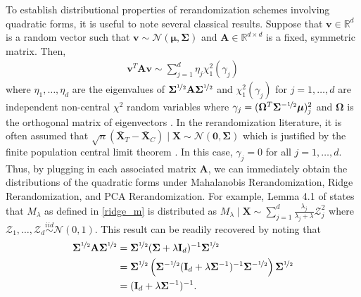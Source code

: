 \documentclass[11pt,twoside]{article}
\theoremstyle{definition}
\theoremstyle{remark}
\begin{document}
To establish distributional properties of rerandomization schemes involving quadratic forms, it is useful to note several classical results. Suppose that $\mathbf{v} \in \mathbb{R}^d$ is a random vector such that $\mathbf{v} \sim \mathcal{N}(\bm{\mu}, \mathbf{\Sigma})$ and $\mathbf{A} \in \mathbb{R}^{d \times d}$ is a fixed, symmetric matrix. Then,
\begin{align} \label{qfr_distribution}
    \mathbf{v}^T \mathbf{A} \mathbf{v} \sim \sum^d_{j=1} \eta_j \chi^2_1(\gamma_j)
\end{align}
where $\eta_1, \ldots, \eta_d$ are the eigenvalues of $\mathbf{\Sigma}^{\nicefrac{1}{2}} \mathbf{A} \mathbf{\Sigma}^{\nicefrac{1}{2}}$ and $\chi^2_1(\gamma_j)$ for $j = 1, \ldots, d$ are independent non-central $\chi^2$ random variables where $\gamma_j = (\mathbf{\Omega}^T \mathbf{\Sigma}^{-\nicefrac{1}{2}} \bm{\mu})^2_j$ and $\mathbf{\Omega}$ is the orthogonal matrix of eigenvectors \citep{mathai1992quadratic}. In the rerandomization literature, it is often assumed that $\sqrt{n}(\bar{\mathbf{X}}_T - \bar{\mathbf{X}}_C) \mid \mathbf{X} \sim \mathcal{N}(\mathbf{0}, \mathbf{\Sigma})$ which is justified by the finite population central limit theorem \citep{li2017general}. In this case, $\gamma_j = 0$ for all $j = 1, \dots, d$. Thus, by plugging in each associated matrix $\mathbf{A}$, we can immediately obtain the distributions of the quadratic forms under Mahalanobis Rerandomization, Ridge Rerandomization, and PCA Rerandomization. For example, Lemma 4.1 of \cite{branson2021ridge} states that $M_{\lambda}$ as defined in \cref{ridge_m} is distributed as $ M_{\lambda} \mid \mathbf{X} \sim \sum_{j=1}^d \frac{\lambda_j}{\lambda_j + \lambda} \mathcal{Z}^2_j$ where $\mathcal{Z}_1, \ldots, \mathcal{Z}_d \overset{iid}{\sim} \mathcal{N}(0, 1)$. This result can be readily recovered by noting that
\begin{align*}
    \mathbf{\Sigma}^{\nicefrac{1}{2}} \mathbf{A} \mathbf{\Sigma}^{\nicefrac{1}{2}} &= \mathbf{\Sigma}^{\nicefrac{1}{2}} (\mathbf{\Sigma} + \lambda \mathbf{I}_d)^{-1} \mathbf{\Sigma}^{\nicefrac{1}{2}} \\
    &= \mathbf{\Sigma}^{\nicefrac{1}{2}} \left(\mathbf{\Sigma}^{-\nicefrac{1}{2}} (\mathbf{I}_d + \lambda \mathbf{\Sigma}^{-1})^{-1} \mathbf{\Sigma}^{-\nicefrac{1}{2}} \right) \mathbf{\Sigma}^{\nicefrac{1}{2}} \\
    &= (\mathbf{I}_d + \lambda \mathbf{\Sigma}^{-1})^{-1}.
\end{align*}
\end{document}
